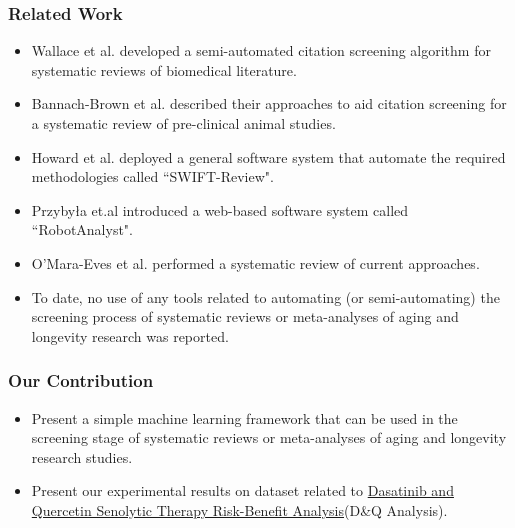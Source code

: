 \documentclass[10pt, xcolor={dvipsnames}]{beamer}
\begin{document}
\begin{frame}
\frametitle{Related Work}
\begin{itemize}
\item Wallace et al. developed a semi-automated citation screening algorithm
for systematic reviews of biomedical literature. 
\item Bannach-Brown et al. described their approaches to aid citation
screening for a systematic review of pre-clinical animal studies. 
\item Howard et al. deployed a general software system that automate the required methodologies called ``SWIFT-Review". 
\item Przybyła et.al introduced a web-based software system called ``RobotAnalyst". \item O'Mara-Eves et al. performed a systematic review of current approaches.
\item To date, no use of any tools related to automating (or semi-automating) the screening process of systematic reviews or meta-analyses of aging and longevity research was reported.
\end{itemize}
\end{frame}

\begin{frame}
\frametitle{Our Contribution}
\begin{itemize}
\item Present a simple machine learning framework that can be used in the screening stage of systematic reviews or meta-analyses of aging and longevity research studies.
\item Present our experimental results on dataset related to \href{https://brain.forever-healthy.org/display/EN/}{Dasatinib and Quercetin Senolytic Therapy Risk-Benefit Analysis}\footnotemark (D\&Q Analysis).
\end{itemize}
%
\end{frame}
\end{document}
